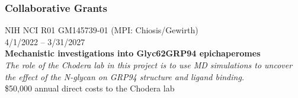 \documentclass[10pt]{article}
\begin{document}

% 






\subsubsection*{Collaborative Grants}


NIH NCI R01 GM145739‑01 (MPI: Chiosis/Gewirth)\\
4/1/2022 -- 3/31/2027\\
{\bf Mechanistic investigations into Glyc62GRP94 epichaperomes}\\
\emph{The role of the Chodera lab in this project is to use MD simulations to uncover the effect of the N-glycan on GRP94 structure and ligand binding.}\\
\$50,000 annual direct costs to the Chodera lab
\end{document}
